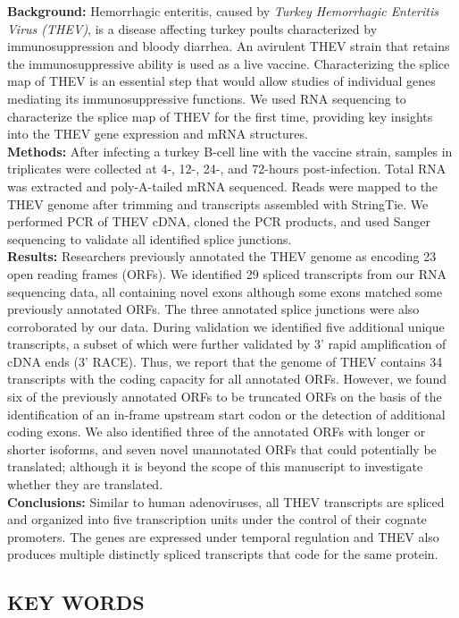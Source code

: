 \documentclass[
]{article}
\begin{document}
\textbf{Background:} Hemorrhagic enteritis, caused by \emph{Turkey
Hemorrhagic Enteritis Virus (THEV)}, is a disease affecting turkey
poults characterized by immunosuppression and bloody diarrhea. An
avirulent THEV strain that retains the immunosuppressive ability is used
as a live vaccine. Characterizing the splice map of THEV is an essential
step that would allow studies of individual genes mediating its
immunosuppressive functions. We used RNA sequencing to characterize the
splice map of THEV for the first time, providing key insights into the
THEV gene expression and mRNA structures.\\
\textbf{Methods:} After infecting a turkey B-cell line with the vaccine
strain, samples in triplicates were collected at 4-, 12-, 24-, and
72-hours post-infection. Total RNA was extracted and poly-A-tailed mRNA
sequenced. Reads were mapped to the THEV genome after trimming and
transcripts assembled with StringTie. We performed PCR of THEV cDNA,
cloned the PCR products, and used Sanger sequencing to validate all
identified splice junctions.\\
\textbf{Results:} Researchers previously annotated the THEV genome as
encoding 23 open reading frames (ORFs). We identified 29 spliced
transcripts from our RNA sequencing data, all containing novel exons
although some exons matched some previously annotated ORFs. The three
annotated splice junctions were also corroborated by our data. During
validation we identified five additional unique transcripts, a subset of
which were further validated by 3' rapid amplification of cDNA ends (3'
RACE). Thus, we report that the genome of THEV contains 34 transcripts
with the coding capacity for all annotated ORFs. However, we found six
of the previously annotated ORFs to be truncated ORFs on the basis of
the identification of an in-frame upstream start codon or the detection
of additional coding exons. We also identified three of the annotated
ORFs with longer or shorter isoforms, and seven novel unannotated ORFs
that could potentially be translated; although it is beyond the scope of
this manuscript to investigate whether they are translated.\\
\textbf{Conclusions:} Similar to human adenoviruses, all THEV
transcripts are spliced and organized into five transcription units
under the control of their cognate promoters. The genes are expressed
under temporal regulation and THEV also produces multiple distinctly
spliced transcripts that code for the same protein.

\subsection{KEY WORDS}\label{key-words}
\end{document}
